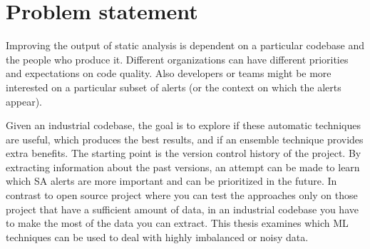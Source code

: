 
\section{Problem statement}\label{sec:problem-statement}





Improving the output of static analysis is dependent on a particular codebase and the people who produce it. Different organizations can have different priorities and expectations on code quality. Also developers or teams might be more interested on a particular subset of alerts (or the context on which the alerts appear).

Given an industrial codebase, the goal is to explore if these automatic techniques are useful, which produces the best results, and if an ensemble technique provides extra benefits. The starting point is the version control history of the project. By extracting information about the past versions, an attempt can be made to learn which SA alerts are more important and can be prioritized in the future. In contrast to open source project where you can test the approaches only on those project that have a sufficient amount of data, in an industrial codebase you have to make the most of the data you can extract. This thesis examines which ML techniques can be used to deal with highly imbalanced or noisy data.

